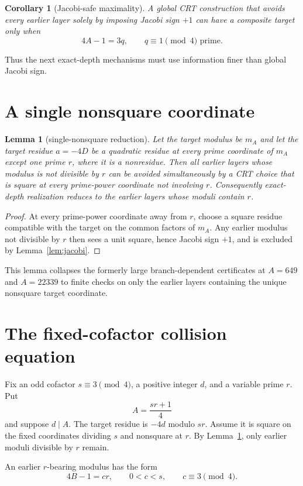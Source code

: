 \documentclass[11pt]{article}
\newtheorem{lemma}[theorem]{Lemma}
\newtheorem{corollary}[theorem]{Corollary}
\theoremstyle{definition}
\begin{document}
\begin{corollary}[Jacobi-safe maximality]\label{cor:jacmax}
A global CRT construction that avoids every earlier layer solely by imposing Jacobi sign $+1$ can have a composite target only when
\[
4A-1=3q,\qquad q\equiv1\pmod4\text{ prime}.
\]
\end{corollary}

Thus the next exact-depth mechanisms must use information finer than global Jacobi sign.

\section{A single nonsquare coordinate}
\begin{lemma}[single-nonsquare reduction]\label{lem:single}
Let the target modulus be $m_A$ and let the target residue $a=-4D$ be a quadratic residue at every prime coordinate of $m_A$ except one prime $r$, where it is a nonresidue. Then all earlier layers whose modulus is not divisible by $r$ can be avoided simultaneously by a CRT choice that is square at every prime-power coordinate not involving $r$. Consequently exact-depth realization reduces to the earlier layers whose moduli contain $r$.
\end{lemma}

\begin{proof}
At every prime-power coordinate away from $r$, choose a square residue compatible with the target on the common factors of $m_A$. Any earlier modulus not divisible by $r$ then sees a unit square, hence Jacobi sign $+1$, and is excluded by Lemma~\ref{lem:jacobi}.
\end{proof}

This lemma collapses the formerly large branch-dependent certificates at $A=649$ and $A=22339$ to finite checks on only the earlier layers containing the unique nonsquare target coordinate.

\section{The fixed-cofactor collision equation}
Fix an odd cofactor $s\equiv3\pmod4$, a positive integer $d$, and a variable prime $r$. Put
\[
A=\frac{sr+1}{4}
\]
and suppose $d\mid A$. The target residue is $-4d$ modulo $sr$. Assume it is square on the fixed coordinates dividing $s$ and nonsquare at $r$. By Lemma~\ref{lem:single}, only earlier moduli divisible by $r$ remain.

An earlier $r$-bearing modulus has the form
\[
4B-1=cr,
\qquad 0<c<s,
\qquad c\equiv3\pmod4.
\]
\end{document}
